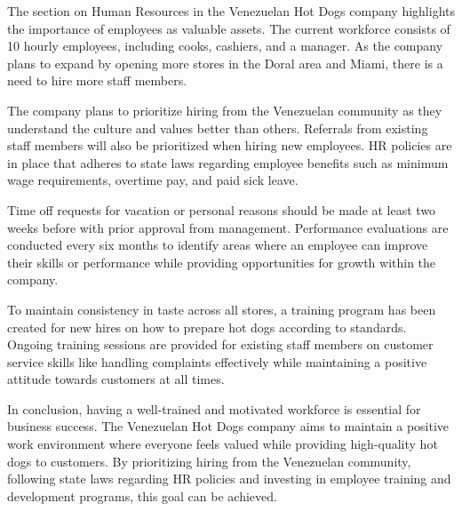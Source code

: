 The section on Human Resources in the Venezuelan Hot Dogs company highlights the importance of employees as valuable assets. The current workforce consists of 10 hourly employees, including cooks, cashiers, and a manager. As the company plans to expand by opening more stores in the Doral area and Miami, there is a need to hire more staff members.

The company plans to prioritize hiring from the Venezuelan community as they understand the culture and values better than others. Referrals from existing staff members will also be prioritized when hiring new employees. HR policies are in place that adheres to state laws regarding employee benefits such as minimum wage requirements, overtime pay, and paid sick leave.

Time off requests for vacation or personal reasons should be made at least two weeks before with prior approval from management. Performance evaluations are conducted every six months to identify areas where an employee can improve their skills or performance while providing opportunities for growth within the company.

To maintain consistency in taste across all stores, a training program has been created for new hires on how to prepare hot dogs according to standards. Ongoing training sessions are provided for existing staff members on customer service skills like handling complaints effectively while maintaining a positive attitude towards customers at all times.

In conclusion, having a well-trained and motivated workforce is essential for business success. The Venezuelan Hot Dogs company aims to maintain a positive work environment where everyone feels valued while providing high-quality hot dogs to customers. By prioritizing hiring from the Venezuelan community, following state laws regarding HR policies and investing in employee training and development programs, this goal can be achieved.